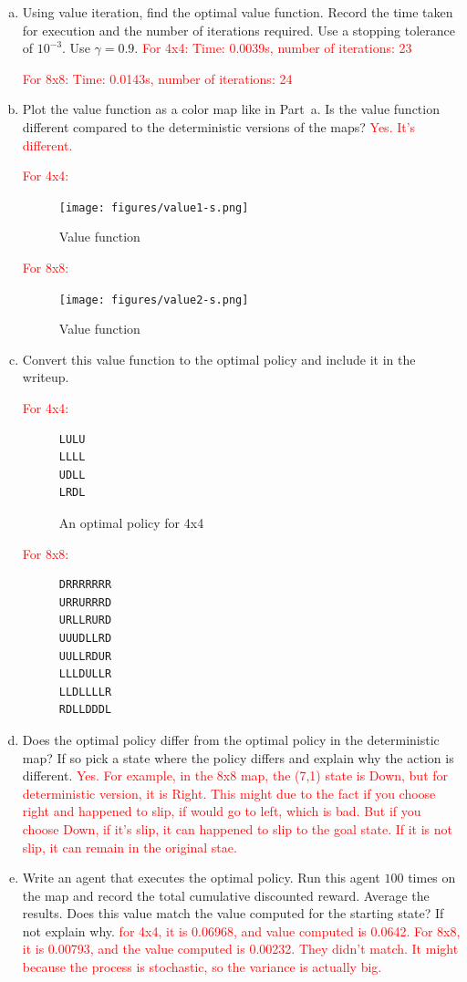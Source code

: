 \documentclass[12pt]{article}
\newcommand{\yl}[1]{\textcolor{red}{#1}}
\begin{document}
\begin{enumerate}[a)]
\item Using value iteration, find the optimal value function. Record
  the time taken for execution and the number of iterations required. Use a
  stopping tolerance of $10^{-3}$. Use $\gamma=0.9$. \yl{For 4x4:
  Time: 0.0039s, number of iterations: 23}
  
  \yl{For 8x8:
  Time: 0.0143s, number of iterations: 24}
\item Plot the value function as a color map like in Part~a. Is the
  value function different compared to the deterministic versions of
  the maps?
  \yl{Yes. It's different.}
  
  \yl{For 4x4:}
  \begin{figure}[H]
  \centering
  \texttt{[image: figures/value1-s.png]}
  \caption{Value function}
\end{figure}

  \yl{For 8x8:}
  
  \begin{figure}[H]
  \centering
  \texttt{[image: figures/value2-s.png]}
  \caption{Value function}
\end{figure}
  
  
\item Convert this value function to the optimal policy and include it
  in the writeup.
  
  \yl{For 4x4:}
  \begin{figure}[H]
  \centering
  \begin{BVerbatim}
LULU
LLLL
UDLL
LRDL
  \end{BVerbatim}
  \caption{An optimal policy for 4x4}
\end{figure}

  \yl{For 8x8:}
  \begin{figure}[H]
  \centering
  \begin{BVerbatim}
DRRRRRRR
URRURRRD
URLLRURD
UUUDLLRD
UULLRDUR
LLLDULLR
LLDLLLLR
RDLLDDDL
  \end{BVerbatim}
  \end{figure}
\item Does the optimal policy differ from the optimal policy in the 
  deterministic map? 
  If so pick a state where the policy differs and explain why the action is
  different. \yl{Yes. For example, in the 8x8 map, the (7,1) state is Down, but for deterministic version, it is Right. This might due to the fact if you choose right and happened to slip, if would go to left, which is bad. But if you choose Down, if it's slip, it can happened to slip to the goal state. If it is not slip, it can remain in the original stae.}
\item Write an agent that executes the optimal policy. Run this agent
  $100$ times on the map and record the total cumulative discounted
  reward. Average the results. Does this value match the value
  computed for the starting state? If not explain why. \yl{for 4x4, it is 0.06968, and value computed is 0.0642. For 8x8, it is 0.00793, and the value computed is 0.00232. They didn't match. It might because the process is stochastic, so the variance is actually big.}
\end{enumerate}
\end{document}
